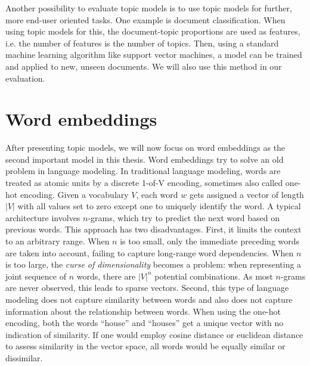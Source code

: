 \documentclass[
        a4paper,
        titlepage,
        twoside,
        parskip,
        numbers=noenddot
        ]{scrbook}
\theoremstyle{break}
\begin{document}
Another possibility to evaluate topic models is to use topic models for further, more end-user oriented tasks.
One example is document classification.
When using topic models for this, the document-topic proportions are used as features, i.e. the number of features is the number of topics.
Then, using a standard machine learning algorithm like support vector machines, a model can be trained and applied to new, unseen documents.
We will also use this method in our evaluation.

\section{Word embeddings}

After presenting topic models, we will now focus on word embeddings as the second important model in this thesis.
Word embeddings try to solve an old problem in language modeling.
In traditional language modeling, words are treated as atomic units by a discrete 1-of-V encoding, sometimes also called one-hot encoding.
Given a vocabulary $V$, each word $w$ gets assigned a vector of length $|V|$ with all values set to zero except one to uniquely identify the word.
A typical architecture involves $n$-grams, which try to predict the next word based on previous words.
This approach has two disadvantages.
First, it limits the context to an arbitrary range.
When $n$ is too small, only the immediate preceding words are taken into account, failing to capture long-range word dependencies.
When $n$ is too large, the \emph{curse of dimensionality} becomes a problem: when representing a joint sequence of $n$ words, there are $|V|^n$ potential combinations.
As most $n$-grams are never observed, this leads to sparse vectors.
Second, this type of language modeling does not capture similarity between words and also does not capture information about the relationship between words.
When using the one-hot encoding, both the words ``house'' and ``houses'' get a unique vector with no indication of similarity.
If one would employ cosine distance or euclidean distance to assess similarity in the vector space, all words would be equally similar or dissimilar.
\end{document}
